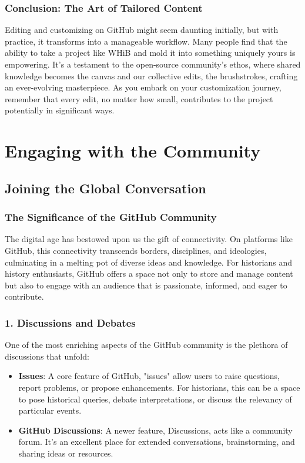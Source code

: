 \documentclass[a4paper,12pt]{book}
\begin{document}
\subsection*{Conclusion: The Art of Tailored Content}
Editing and customizing on GitHub might seem daunting initially, but with practice, it transforms into a manageable workflow. Many people find that the ability to take a project like WHiB and mold it into something uniquely yours is empowering. It's a testament to the open-source community's ethos, where shared knowledge becomes the canvas and our collective edits, the brushstrokes, crafting an ever-evolving masterpiece. As you embark on your customization journey, remember that every edit, no matter how small, contributes to the project potentially in significant ways.

\chapter{Engaging with the Community}
\section*{Joining the Global Conversation}

\subsection*{The Significance of the GitHub Community}
The digital age has bestowed upon us the gift of connectivity. On platforms like GitHub, this connectivity transcends borders, disciplines, and ideologies, culminating in a melting pot of diverse ideas and knowledge. For historians and history enthusiasts, GitHub offers a space not only to store and manage content but also to engage with an audience that is passionate, informed, and eager to contribute.

\subsection*{1. Discussions and Debates}
One of the most enriching aspects of the GitHub community is the plethora of discussions that unfold:

\begin{itemize}
    \item \textbf{Issues}: A core feature of GitHub, "issues" allow users to raise questions, report problems, or propose enhancements. For historians, this can be a space to pose historical queries, debate interpretations, or discuss the relevancy of particular events.
    \item \textbf{GitHub Discussions}: A newer feature, Discussions, acts like a community forum. It's an excellent place for extended conversations, brainstorming, and sharing ideas or resources.
\end{itemize}
\end{document}
